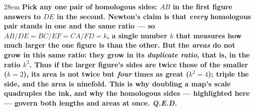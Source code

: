 \documentclass[border=4pt]{standalone}
\begin{document}
\begin{varwidth}{28em}
\large\bfseries
Pick any one pair of homologous sides: $AB$ in the first figure answers to $DE$ in the second. Newton's claim is that \emph{every} homologous pair stands in one and the same ratio --- so $AB/DE = BC/EF = CA/FD = k$, a single number $k$ that measures how much larger the one figure is than the other. But the \emph{areas} do not grow in this same ratio: they grow in its \emph{duplicate ratio}, that is, in the ratio $k^2$. Thus if the larger figure's sides are twice those of the smaller ($k = 2$), its area is not twice but \emph{four} times as great ($k^2 = 4$); triple the side, and the area is ninefold. This is why doubling a map's scale quadruples the ink, and why the homologous sides --- highlighted here --- govern both lengths and areas at once. \textit{Q.E.D.}
\end{varwidth}
\end{document}
